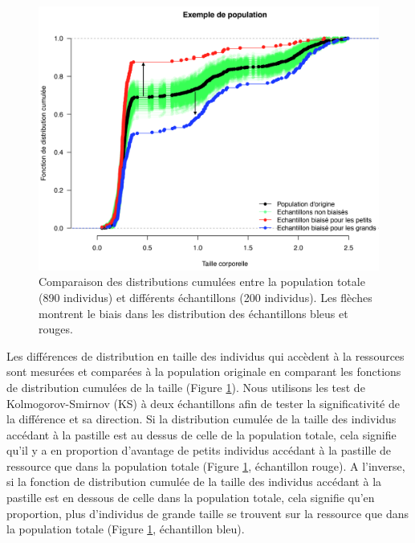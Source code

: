 \begin{figure}[!ht]
\begin{center}
\includegraphics[width=1\textwidth]{1_CorpsDeThese/Resumes/Fig/SM02}
\caption[Comparaison des
distributions cumulées]{Comparaison des distributions cumulées entre la
population totale (890 individus) et différents échantillons (200 individus).
Les flèches montrent le biais dans les distribution des échantillons bleus et
rouges.}
\label{fig:SM2}
\end{center}
\end{figure}

Les différences de distribution en taille des individus qui accèdent à la
ressources sont mesurées et comparées à la population originale en comparant les
fonctions de distribution cumulées de la taille (Figure \ref{fig:SM2}). Nous
utilisons les test de Kolmogorov-Smirnov (KS) à deux échantillons afin de tester
la significativité de la différence et sa direction. Si la distribution cumulée
de la taille des individus accédant à la pastille est au dessus de celle de la
population totale, cela signifie qu'il y a en proportion d'avantage de petits
individus accédant à la pastille de ressource que dans la population totale
(Figure \ref{fig:SM2}, échantillon rouge). A l'inverse, si la fonction de
distribution cumulée de la taille des individus accédant à la pastille est en
dessous de celle dans la population totale, cela signifie qu'en proportion, plus
d'individus de grande taille se trouvent sur la ressource que dans la population
totale (Figure \ref{fig:SM2}, échantillon bleu).

